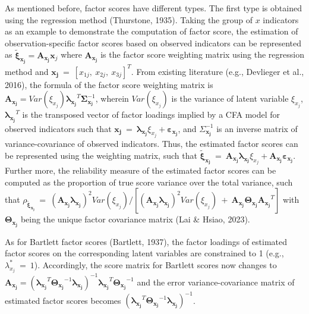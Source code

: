 \documentclass[
  man]{apa6}
\begin{document}
As mentioned before, factor scores have different types. The first type is obtained using the regression method (Thurstone, 1935). Taking the group of \(x\) indicators as an example to demonstrate the computation of factor score, the estimation of observation-specific factor scores based on observed indicators can be represented as \(\boldsymbol{\tilde{\xi}_{x_{j}}} = \boldsymbol{A_{x_{j}}} \boldsymbol{x}_{j}\) where \(\boldsymbol{A_{x_{j}}}\) is the factor score weighting matrix using the regression method and \(\boldsymbol{x_{j}} \ = \ [x_{1j}, \ x_{2j}, \ x_{3j}]^T\). From existing literature (e.g., Devlieger et al., 2016), the formula of the factor score weighting matrix is \(\boldsymbol{A_{x_{j}}} = Var(\xi_{x_{j}})\boldsymbol{\lambda_{x_{j}}}^T\boldsymbol{\Sigma}_{\boldsymbol{x_{j}}}^{-1}\), wherein \(Var(\xi_{x_{j}})\) is the variance of latent variable \(\xi_{x_{j}}\), \(\boldsymbol{\lambda_{x_{j}}}^T\) is the transposed vector of factor loadings implied by a CFA model for observed indicators such that \(\boldsymbol{x_{j}} \ = \ \boldsymbol{\lambda_{x_{j}}}\xi_{x_{j}} + \boldsymbol{\varepsilon_{x_{j}}}\), and \({\Sigma}_{\boldsymbol{x_{j}}}^{-1}\) is an inverse matrix of variance-covariance of observed indicators. Thus, the estimated factor scores can be represented using the weighting matrix, such that \(\boldsymbol{\tilde{\xi}_{x_{j}}} \ = \ \boldsymbol{A_{x_{j}}} \boldsymbol{\lambda_{x_{j}}}\xi_{x_{j}} + \boldsymbol{A_{x_{j}}}\boldsymbol{\varepsilon_{x_{j}}}\). Further more, the reliability measure of the estimated factor scores can be computed as the proportion of true score variance over the total variance, such that \(\rho_{\boldsymbol{\tilde{\xi}_{x_{j}}}} \ = \ (\boldsymbol{A_{x_{j}}} \boldsymbol{\lambda_{x_{j}}})^2Var(\xi_{x_{j}})/[(\boldsymbol{A_{x_{j}}} \boldsymbol{\lambda_{x_{j}}})^2Var(\xi_{x_{j}}) \ + \ \boldsymbol{A_{x_{j}}}\boldsymbol{\Theta_{x_{j}}}\boldsymbol{A_{x_{j}}}^T]\) with \(\boldsymbol{\Theta_{x_{j}}}\) being the unique factor covariance matrix (Lai \& Hsiao, 2023).

As for Bartlett factor scores (Bartlett, 1937), the factor loadings of estimated factor scores on the corresponding latent variables are constrained to 1 (e.g., \(\lambda_{x_{j}}^\text{*} \ = \ 1\)). Accordingly, the score matrix for Bartlett scores now changes to \(\boldsymbol{A_{x_{j}}} = (\boldsymbol{\lambda_{x_{j}}}^T\boldsymbol{\Theta_{x_{j}}}^{-1}\boldsymbol{\lambda_{x_{j}}})^{-1}\boldsymbol{\lambda_{x_{j}}}^T\boldsymbol{\Theta_{x_{j}}}^{-1}\) and the error variance-covariance matrix of estimated factor scores becomes \((\boldsymbol{\lambda_{x_{j}}}^T\boldsymbol{\Theta_{x_{j}}}^{-1}\boldsymbol{\lambda_{x_{j}}})^{-1}\).
\end{document}
